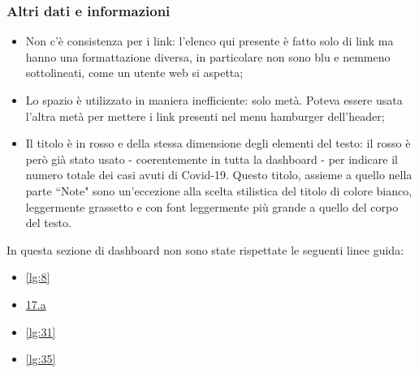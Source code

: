 \subsubsection{Altri dati e informazioni}
\begin{itemize}
    \item Non c'è consistenza per i link: l'elenco qui presente è fatto solo di link ma hanno una formattazione diversa, in particolare non sono blu e nemmeno sottolineati, come un utente web si aspetta;
    \item Lo spazio è utilizzato in maniera inefficiente: solo metà. Poteva essere usata l'altra metà per mettere i link presenti nel menu hamburger dell'header;
    \item Il titolo è in rosso e della stessa dimensione degli elementi del testo: il rosso è però già stato usato - coerentemente in tutta la dashboard - per indicare il numero totale dei casi avuti di Covid-19. Questo titolo, assieme a quello nella parte ``Note" sono un'eccezione alla scelta stilistica del titolo di colore bianco, leggermente grassetto e con font leggermente più grande a quello del corpo del testo.
\end{itemize}
In questa sezione di dashboard non sono state rispettate le seguenti linee guida:
\begin{itemize}
    \item \ref{lg:8}
    \item \hyperref[lg:17.a]{17.a}
    \item \ref{lg:31}
    \item \ref{lg:35}
\end{itemize}

